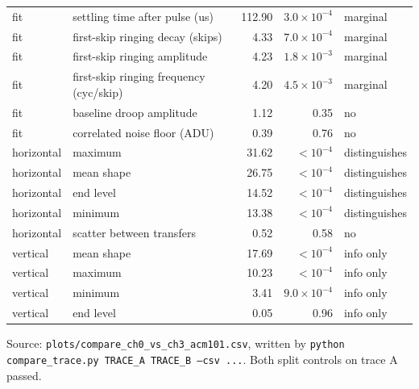 \documentclass[11pt]{article}
\newcommand{\code}[1]{\texttt{#1}}
\begin{document}
\begin{center}
\begin{tabular}{llrrl}
fit & settling time after pulse (us) & 112.90 & $3.0\times10^{-4}$ & marginal \\
fit & first-skip ringing decay (skips) & 4.33 & $7.0\times10^{-4}$ & marginal \\
fit & first-skip ringing amplitude & 4.23 & $1.8\times10^{-3}$ & marginal \\
fit & first-skip ringing frequency (cyc/skip) & 4.20 & $4.5\times10^{-3}$ & marginal \\
fit & baseline droop amplitude & 1.12 & 0.35 & no \\
fit & correlated noise floor (ADU) & 0.39 & 0.76 & no \\
horizontal & maximum & 31.62 & $<10^{-4}$ & distinguishes \\
horizontal & mean shape & 26.75 & $<10^{-4}$ & distinguishes \\
horizontal & end level & 14.52 & $<10^{-4}$ & distinguishes \\
horizontal & minimum & 13.38 & $<10^{-4}$ & distinguishes \\
horizontal & scatter between transfers & 0.52 & 0.58 & no \\
vertical & mean shape & 17.69 & $<10^{-4}$ & info only \\
vertical & maximum & 10.23 & $<10^{-4}$ & info only \\
vertical & minimum & 3.41 & $9.0\times10^{-4}$ & info only \\
vertical & end level & 0.05 & 0.96 & info only \\
\bottomrule
\end{tabular}
\end{center}

\noindent Source: \code{plots/compare\_ch0\_vs\_ch3\_acm101.csv}, written by
\code{python compare\_trace.py TRACE\_A TRACE\_B --csv ...}. Both split controls on trace A passed.
\end{document}
